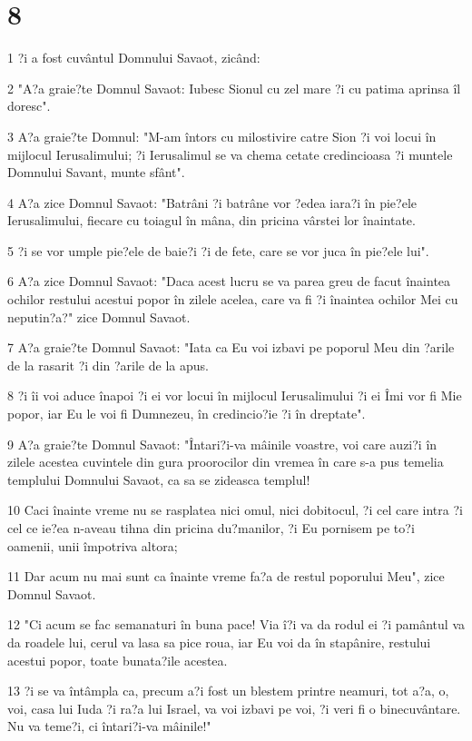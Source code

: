 \chapter{8}

\par 1 ?i a fost cuvântul Domnului Savaot, zicând:
\par 2 "A?a graie?te Domnul Savaot: Iubesc Sionul cu zel mare ?i cu patima aprinsa îl doresc".
\par 3 A?a graie?te Domnul: "M-am întors cu milostivire catre Sion ?i voi locui în mijlocul Ierusalimului; ?i Ierusalimul se va chema cetate credincioasa ?i muntele Domnului Savant, munte sfânt".
\par 4 A?a zice Domnul Savaot: "Batrâni ?i batrâne vor ?edea iara?i în pie?ele Ierusalimului, fiecare cu toiagul în mâna, din pricina vârstei lor înaintate.
\par 5 ?i se vor umple pie?ele de baie?i ?i de fete, care se vor juca în pie?ele lui".
\par 6 A?a zice Domnul Savaot: "Daca acest lucru se va parea greu de facut înaintea ochilor restului acestui popor în zilele acelea, care va fi ?i înaintea ochilor Mei cu neputin?a?" zice Domnul Savaot.
\par 7 A?a graie?te Domnul Savaot: "Iata ca Eu voi izbavi pe poporul Meu din ?arile de la rasarit ?i din ?arile de la apus.
\par 8 ?i îi voi aduce înapoi ?i ei vor locui în mijlocul Ierusalimului ?i ei Îmi vor fi Mie popor, iar Eu le voi fi Dumnezeu, în credincio?ie ?i în dreptate".
\par 9 A?a graie?te Domnul Savaot: "Întari?i-va mâinile voastre, voi care auzi?i în zilele acestea cuvintele din gura proorocilor din vremea în care s-a pus temelia templului Domnului Savaot, ca sa se zideasca templul!
\par 10 Caci înainte vreme nu se rasplatea nici omul, nici dobitocul, ?i cel care intra ?i cel ce ie?ea n-aveau tihna din pricina du?manilor, ?i Eu pornisem pe to?i oamenii, unii împotriva altora;
\par 11 Dar acum nu mai sunt ca înainte vreme fa?a de restul poporului Meu", zice Domnul Savaot.
\par 12 "Ci acum se fac semanaturi în buna pace! Via î?i va da rodul ei ?i pamântul va da roadele lui, cerul va lasa sa pice roua, iar Eu voi da în stapânire, restului acestui popor, toate bunata?ile acestea.
\par 13 ?i se va întâmpla ca, precum a?i fost un blestem printre neamuri, tot a?a, o, voi, casa lui Iuda ?i ra?a lui Israel, va voi izbavi pe voi, ?i veri fi o binecuvântare. Nu va teme?i, ci întari?i-va mâinile!"
